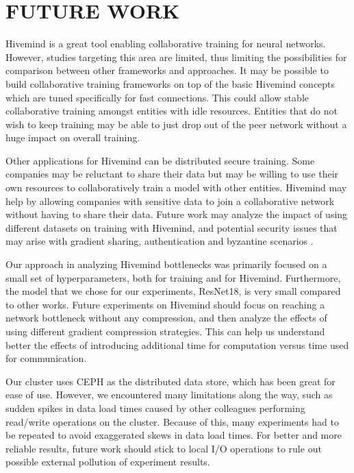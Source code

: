 \chapter{FUTURE WORK}\label{chapter:future-work}

Hivemind is a great tool enabling collaborative training for neural networks.
However, studies targeting this area are limited, thus limiting the possibilities for comparison between other frameworks and approaches.
It may be possible to build collaborative training frameworks on top of the basic Hivemind concepts which are tuned specifically for fast connections.
This could allow stable collaborative training amongst entities with idle resources.
Entities that do not wish to keep training may be able to just drop out of the peer network without a huge impact on overall training.

Other applications for Hivemind can be distributed secure training.
Some companies may be reluctant to share their data but may be willing to use their own resources to collaboratively train a model with other entities.
Hivemind may help by allowing companies with sensitive data to join a collaborative network without having to share their data.
Future work may analyze the impact of using different datasets on training with Hivemind, and potential security issues that may arise with gradient sharing, authentication and byzantine scenarios \cite{DBLP:journals/corr/abs-2106-11257}.

Our approach in analyzing Hivemind bottlenecks was primarily focused on a small set of hyperparameters, both for training and for Hivemind.
Furthermore, the model that we chose for our experiments, ResNet18, is very small compared to other works.
Future experiments on Hivemind should focus on reaching a network bottleneck without any compression, and then analyze the effects of using different gradient compression strategies.
This can help us understand better the effects of introducing additional time for computation versus time used for communication.

Our cluster uses CEPH as the distributed data store, which has been great for ease of use.
However, we encountered many limitations along the way, such as sudden spikes in data load times caused by other colleagues performing read/write operations on the cluster.
Because of this, many experiments had to be repeated to avoid exaggerated skews in data load times.
For better and more reliable results, future work should stick to local I/O operations to rule out possible external pollution of experiment results.


